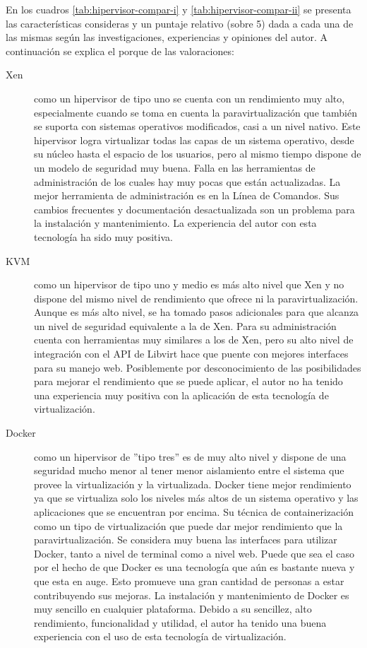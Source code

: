 En los cuadros \ref{tab:hipervisor-compar-i} y \ref{tab:hipervisor-compar-ii} se presenta las características consideras y un puntaje relativo (sobre 5) dada a cada una de las mismas según las investigaciones, experiencias y opiniones del autor. A continuación se explica el porque de las valoraciones:
\begin{description}
	\item[Xen] como un hipervisor de tipo uno se cuenta con un rendimiento muy alto, especialmente cuando se toma en cuenta la paravirtualización que también se suporta con sistemas operativos modificados, casi a un nivel nativo. Este hipervisor logra virtualizar todas las capas de un sistema operativo, desde su núcleo hasta el espacio de los usuarios, pero al mismo tiempo dispone de un modelo de seguridad muy buena. Falla en las herramientas de administración de los cuales hay muy pocas que están actualizadas. La mejor herramienta de administración es en la Línea de Comandos. Sus cambios frecuentes y documentación desactualizada son un problema para la instalación y mantenimiento. La experiencia del autor con esta tecnología ha sido muy positiva.
    \item[KVM] como un hipervisor de tipo uno y medio es más alto nivel que Xen y no dispone del mismo nivel de rendimiento que ofrece ni la paravirtualización. Aunque es más alto nivel, se ha tomado pasos adicionales para que alcanza un nivel de seguridad equivalente a la de Xen. Para su administración cuenta con herramientas muy similares a los de Xen, pero su alto nivel de integración con el API de Libvirt hace que puente con mejores interfaces para su manejo web. Posiblemente por desconocimiento de las posibilidades para mejorar el rendimiento que se puede aplicar, el autor no ha tenido una experiencia muy positiva con la aplicación de esta tecnología de virtualización.
    \item[Docker] como un hipervisor de ''tipo tres'' es de muy alto nivel y dispone de una seguridad mucho menor al tener menor aislamiento entre el sistema que provee la virtualización y la virtualizada. Docker tiene mejor rendimiento ya que se virtualiza solo los niveles más altos de un sistema operativo y las aplicaciones que se encuentran por encima. Su técnica de containerización como un tipo de virtualización que puede dar mejor rendimiento que la paravirtualización. Se considera muy buena las interfaces para utilizar Docker, tanto a nivel de terminal como a nivel web. Puede que sea el caso por el hecho de que Docker es una tecnología que aún es bastante nueva y que esta en auge. Esto promueve una gran cantidad de personas a estar contribuyendo sus mejoras. La instalación y mantenimiento de Docker es muy sencillo en cualquier plataforma. Debido a su sencillez, alto rendimiento, funcionalidad y utilidad, el autor ha tenido una buena experiencia con el uso de esta tecnología de virtualización. 
\end{description}

